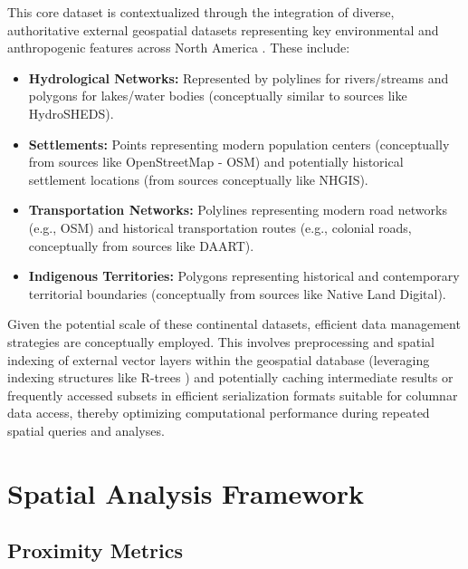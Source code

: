 This core dataset is contextualized through the integration of diverse, authoritative external geospatial datasets representing key environmental and anthropogenic features across North America \cite{Worboys2004}. These include:
\begin{itemize}
    \item \textbf{Hydrological Networks:} Represented by polylines for rivers/streams and polygons for lakes/water bodies (conceptually similar to sources like HydroSHEDS).
    \item \textbf{Settlements:} Points representing modern population centers (conceptually from sources like OpenStreetMap - OSM) and potentially historical settlement locations (from sources conceptually like NHGIS).
    \item \textbf{Transportation Networks:} Polylines representing modern road networks (e.g., OSM) and historical transportation routes (e.g., colonial roads, conceptually from sources like DAART).
    \item \textbf{Indigenous Territories:} Polygons representing historical and contemporary territorial boundaries (conceptually from sources like Native Land Digital).
\end{itemize}
Given the potential scale of these continental datasets, efficient data management strategies are conceptually employed. This involves preprocessing and spatial indexing of external vector layers within the geospatial database (leveraging indexing structures like R-trees \cite{Guttman1984}) and potentially caching intermediate results or frequently accessed subsets in efficient serialization formats suitable for columnar data access, thereby optimizing computational performance during repeated spatial queries and analyses.

\section{Spatial Analysis Framework}
\label{sec:spatial_analysis}

\subsection{Proximity Metrics}
\label{subsec:proximity}

